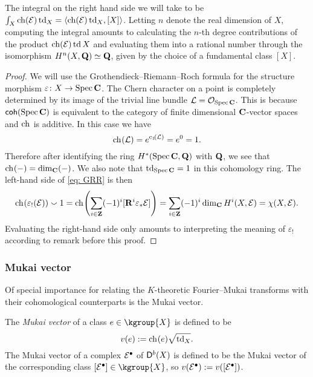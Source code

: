 \begin{remark}
    The integral on the right hand side we will take to be $\int_X \ch{\E}\tdclass{X} = \pairing{\ch{\E}\tdclass{X}}{[X]}$. 
    Letting $n$ denote the real dimension of $X$, computing the integral amounts to calculating the $n$-th degree contributions of the product $\ch{\E}\td{X}$ and evaluating them into a rational number through the isomorphism $H^{n}(X, \mathbf Q) \simeq \mathbf Q$, given by the choice of a fundamental class $[X]$.
\end{remark}

\begin{proof}
    We will use the Grothendieck--Riemann--Roch formula for the structure morphism $\varepsilon \colon X \to \operatorname{Spec}\mathbf C$. The Chern character on a point is completely determined by its image of the trivial line bundle $\mathcal L = {\mathcal{O}_{\operatorname{Spec}\mathbf C}}$. This is because $\mathsf{coh}(\operatorname{Spec}\mathbf C)$ is equivalent to the category of finite dimensional $\mathbf C$-vector spaces and $\ch[]$ is additive. In this case we have
    \[
        \ch[]{\mathcal L} = e^{\cclass[1]{\mathcal L}} = e^0 = 1.
    \]
    Therefore after identifying the ring $H^{*}(\operatorname{Spec}\mathbf C, \mathbf Q)$ with $\mathbf Q$, we see that $\ch[](-) = \dim_\C(-)$. We also note that $\operatorname{td}_{\operatorname{Spec}\mathbf C} = 1$ in this cohomology ring. The left-hand side of \eqref{eq: GRR} is then
    \[
        \ch[]{\varepsilon_!(\E)}\smallsmile 1 = \ch[]{\sum_{i \in \Z}(-1)^i[\rderived{i}{\varepsilon_*}\E]} = \sum_{i\in \Z}(-1)^i\dim_\C\cohom{i}{X}{\E} = \chi(X, \E).
    \]  
    Evaluating the right-hand side only amounts to interpreting the meaning of $\varepsilon_!$ according to remark before this proof.
\end{proof}

\subsubsection*{Mukai vector}

Of special importance for relating the $K$-theoretic Fourier--Mukai transforms with their cohomological counterparts is the Mukai vector. 

\begin{definition}
    The \emph{Mukai vector} of a class $e \in \kgroup{X}$ is defined to be
    \[
        v(e) := \ch[](e)\sqrt{\tdclass{X}}.
    \]
    The Mukai vector of a complex $\mathcal E^\bullet$ of $\mathsf{D}^b(X)$ is defined to be the Mukai vector of the corresponding class $[\E^\bullet] \in \kgroup{X}$, so $v(\mathcal E^\bullet) := v([\mathcal E^\bullet])$.
\end{definition}

